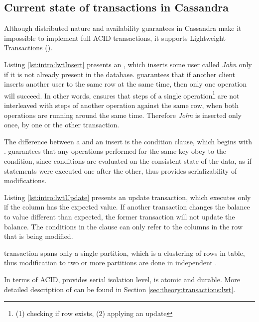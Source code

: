 
\subsection{Current state of transactions in Cassandra}	
Although distributed nature and availability guarantees in Cassandra make it impossible to implement full ACID transactions, it supports Lightweight Transactions (\lwt).

Listing \ref{lst:intro:lwtInsert} presents an \lwt, which inserts some user called \emph{John} only if it is not already present in the database. \lwt  guarantees that if another client inserts another user to the same row at the same time, then only one operation will succeed. In other words, \lwt ensures that steps of a single operation\footnote{(1) checking if row exists, (2) applying an update} are not interleaved with steps of another operation against the same row, when both operations are running around the same time. Therefore \emph{John} is inserted only once, by one or the other transaction.

The difference between a \lwt and an insert is the condition clause, which begins with . \lwt guarantees that any operations performed for the same key obey to the condition, since conditions are evaluated on the consistent state of the data, as if statements were executed one after the other, thus provides serializability of modifications.

Listing \ref{lst:intro:lwtUpdate} presents an update transaction, which executes only if the  column has the expected value. If another transaction changes the balance to value different than expected, the former transaction will not update the balance. The conditions in the  clause can only refer to the columns in the row that is being modified.

\lwt transaction spans only a single partition, which is a clustering of rows in  table, thus modification to two or more partitions are done in independent \lwt.

In terms of ACID, \lwt provides serial isolation level, is atomic and durable.
More detailed description of \lwt can be found in Section \ref{sec:theory:transactions:lwt}.

